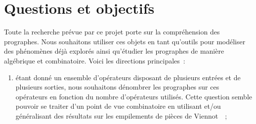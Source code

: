 \documentclass[10pt,reqno]{amsart}
\numberwithin{equation}{subsection}
\begin{document}
\section{Questions et objectifs}
Toute la recherche prévue par ce projet porte sur la compréhension des 
prographes. Nous souhaitons utiliser ces objets en tant qu'outils pour 
modéliser des phénomènes déjà explorés ainsi qu'étudier les prographes 
de manière algébrique et combinatoire. Voici les directions principales~:
\begin{enumerate}[fullwidth,label={\bf (\arabic*)}]
    \item \label{item:objectif_denombrement}
    étant donné un ensemble d'opérateurs disposant de plusieurs entrées 
    et de plusieurs sorties, nous souhaitons dénombrer les prographes 
    sur ces opérateurs en fonction du nombre d'opérateurs utilisés. Cette
    question semble pouvoir se traiter d'un point de vue combinatoire en 
    utilisant et/ou généralisant des résultats sur les empilements de 
    pièces de Viennot~\cite{Vie86}~;
    

\end{enumerate}
\end{document}
